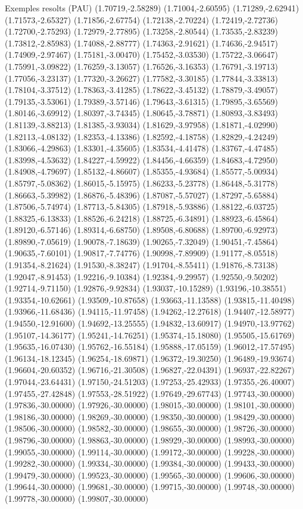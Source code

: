 \documentclass[11pt,a4paper]{article}
\begin{document}
\begin{fmex}{Exemples resolts (PAU)}
(1.70719,-2.58289) (1.71004,-2.60595) (1.71289,-2.62941) (1.71573,-2.65327) (1.71856,-2.67754) (1.72138,-2.70224) (1.72419,-2.72736) (1.72700,-2.75293) (1.72979,-2.77895) (1.73258,-2.80544) (1.73535,-2.83239) (1.73812,-2.85983) (1.74088,-2.88777) (1.74363,-2.91621) (1.74636,-2.94517) (1.74909,-2.97467) (1.75181,-3.00470) (1.75452,-3.03530) (1.75722,-3.06647) (1.75991,-3.09822) (1.76259,-3.13057) (1.76526,-3.16353) (1.76791,-3.19713) (1.77056,-3.23137) (1.77320,-3.26627) (1.77582,-3.30185) (1.77844,-3.33813) (1.78104,-3.37512) (1.78363,-3.41285) (1.78622,-3.45132) (1.78879,-3.49057) (1.79135,-3.53061) (1.79389,-3.57146) (1.79643,-3.61315) (1.79895,-3.65569) (1.80146,-3.69912) (1.80397,-3.74345) (1.80645,-3.78871) (1.80893,-3.83493) (1.81139,-3.88213) (1.81385,-3.93034) (1.81629,-3.97958) (1.81871,-4.02990) (1.82113,-4.08132) (1.82353,-4.13386) (1.82592,-4.18758) (1.82829,-4.24249) (1.83066,-4.29863) (1.83301,-4.35605) (1.83534,-4.41478) (1.83767,-4.47485) (1.83998,-4.53632) (1.84227,-4.59922) (1.84456,-4.66359) (1.84683,-4.72950) (1.84908,-4.79697) (1.85132,-4.86607) (1.85355,-4.93684) (1.85577,-5.00934) (1.85797,-5.08362) (1.86015,-5.15975) (1.86233,-5.23778) (1.86448,-5.31778) (1.86663,-5.39982) (1.86876,-5.48396) (1.87087,-5.57027) (1.87297,-5.65884) (1.87506,-5.74974) (1.87713,-5.84305) (1.87918,-5.93886) (1.88122,-6.03725) (1.88325,-6.13833) (1.88526,-6.24218) (1.88725,-6.34891) (1.88923,-6.45864) (1.89120,-6.57146) (1.89314,-6.68750) (1.89508,-6.80688) (1.89700,-6.92973) (1.89890,-7.05619) (1.90078,-7.18639) (1.90265,-7.32049) (1.90451,-7.45864) (1.90635,-7.60101) (1.90817,-7.74776) (1.90998,-7.89909) (1.91177,-8.05518) (1.91354,-8.21624) (1.91530,-8.38247) (1.91704,-8.55411) (1.91876,-8.73138) (1.92047,-8.91453) (1.92216,-9.10384) (1.92384,-9.29957) (1.92550,-9.50202) (1.92714,-9.71150) (1.92876,-9.92834) (1.93037,-10.15289) (1.93196,-10.38551) (1.93354,-10.62661) (1.93509,-10.87658) (1.93663,-11.13588) (1.93815,-11.40498) (1.93966,-11.68436) (1.94115,-11.97458) (1.94262,-12.27618) (1.94407,-12.58977) (1.94550,-12.91600) (1.94692,-13.25555) (1.94832,-13.60917) (1.94970,-13.97762) (1.95107,-14.36177) (1.95241,-14.76251) (1.95374,-15.18080) (1.95505,-15.61769) (1.95635,-16.07430) (1.95762,-16.55184) (1.95888,-17.05159) (1.96012,-17.57495) (1.96134,-18.12345) (1.96254,-18.69871) (1.96372,-19.30250) (1.96489,-19.93674) (1.96604,-20.60352) (1.96716,-21.30508) (1.96827,-22.04391) (1.96937,-22.82267) (1.97044,-23.64431) (1.97150,-24.51203) (1.97253,-25.42933) (1.97355,-26.40007) (1.97455,-27.42848) (1.97553,-28.51922) (1.97649,-29.67743) (1.97743,-30.00000) (1.97836,-30.00000) (1.97926,-30.00000) (1.98015,-30.00000) (1.98101,-30.00000) (1.98186,-30.00000) (1.98269,-30.00000) (1.98350,-30.00000) (1.98429,-30.00000) (1.98506,-30.00000) (1.98582,-30.00000) (1.98655,-30.00000) (1.98726,-30.00000) (1.98796,-30.00000) (1.98863,-30.00000) (1.98929,-30.00000) (1.98993,-30.00000) (1.99055,-30.00000) (1.99114,-30.00000) (1.99172,-30.00000) (1.99228,-30.00000) (1.99282,-30.00000) (1.99334,-30.00000) (1.99384,-30.00000) (1.99433,-30.00000) (1.99479,-30.00000) (1.99523,-30.00000) (1.99565,-30.00000) (1.99606,-30.00000) (1.99644,-30.00000) (1.99681,-30.00000) (1.99715,-30.00000) (1.99748,-30.00000) (1.99778,-30.00000) (1.99807,-30.00000) 
\end{fmex}
\end{document}
